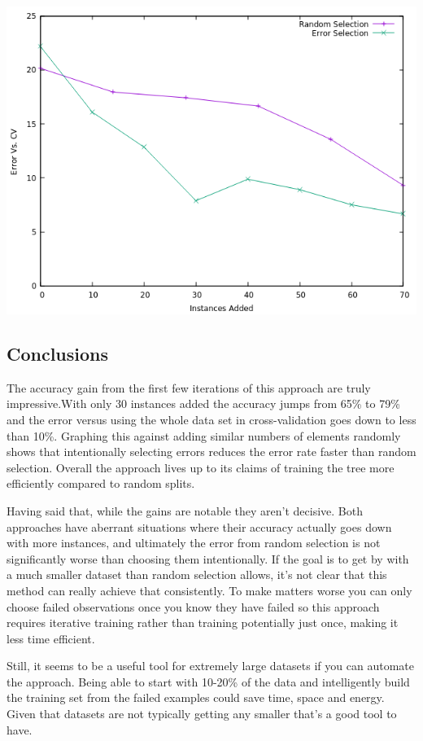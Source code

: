 \documentclass[11pt, letterpaper]{report}
\begin{document}
\bigskip
\includegraphics[scale=0.75]{../img/random_vs_error_selection}

\pagebreak
\subsection{Conclusions}

The accuracy gain from the first few iterations of this approach are truly impressive.With only 30 instances added the accuracy jumps from 65\% to 79\% and the error versus using the whole data set in cross-validation goes down to less than 10\%. Graphing this against adding similar numbers of elements randomly shows that intentionally selecting errors reduces the error rate faster than random selection. Overall the approach lives up to its claims of training the tree more efficiently compared to random splits.

Having said that, while the gains are notable they aren't decisive. Both approaches have aberrant situations where their accuracy actually goes down with more instances, and ultimately the error from random selection is not significantly worse than choosing them intentionally. If the goal is to get by with a much smaller dataset than random selection allows, it's not clear that this method can really achieve that consistently. To make matters worse you can only choose failed observations once you know they have failed so this approach requires iterative training rather than training potentially just once, making it less time efficient.

Still, it seems to be a useful tool for extremely large datasets if you can automate the approach. Being able to start with 10-20\% of the data and intelligently build the training set from the failed examples could save time, space and energy. Given that datasets are not typically getting any smaller that's a good tool to have.
\end{document}
